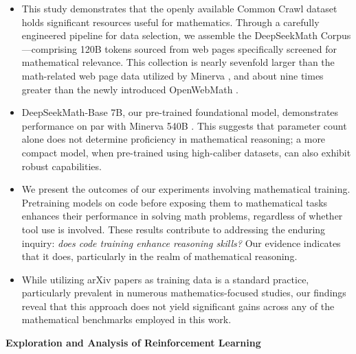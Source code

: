 \begin{itemize}[topsep=0pt]
    \item This study demonstrates that the openly available Common Crawl dataset holds significant resources useful for mathematics. Through a carefully engineered pipeline for data selection, we assemble the DeepSeekMath Corpus—comprising 120B tokens sourced from web pages specifically screened for mathematical relevance. This collection is nearly sevenfold larger than the math-related web page data utilized by Minerva \citep{minerva}, and about nine times greater than the newly introduced OpenWebMath \citep{openwebmath}.

\item DeepSeekMath-Base 7B, our pre-trained foundational model, demonstrates performance on par with Minerva 540B \citep{minerva}. This suggests that parameter count alone does not determine proficiency in mathematical reasoning; a more compact model, when pre-trained using high-caliber datasets, can also exhibit robust capabilities.

\item We present the outcomes of our experiments involving mathematical training. Pretraining models on code before exposing them to mathematical tasks enhances their performance in solving math problems, regardless of whether tool use is involved. These results contribute to addressing the enduring inquiry: \textit{does code training enhance reasoning skills?} Our evidence indicates that it does, particularly in the realm of mathematical reasoning.

\item While utilizing arXiv papers as training data is a standard practice, particularly prevalent in numerous mathematics-focused studies, our findings reveal that this approach does not yield significant gains across any of the mathematical benchmarks employed in this work.
\end{itemize}

\textbf{Exploration and Analysis of Reinforcement Learning}

